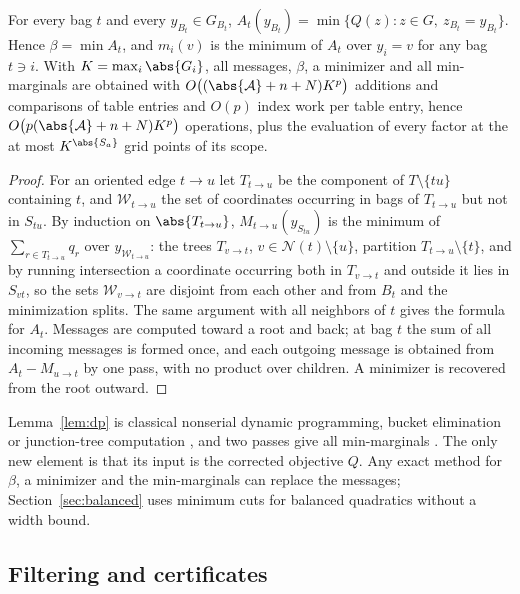 \begin{lemma}\label{lem:dp}
For every bag $t$ and every $y_{B_t}\in G_{B_t}$,
$A_t(y_{B_t})=\min\{Q(z):z\in G,\ z_{B_t}=y_{B_t}\}$. Hence $\beta=\min A_t$, and
$m_i(v)$ is the minimum of $A_t$ over $y_i=v$ for any bag $t\ni i$. With
$K=\max_i\abs{G_i}$, all messages, $\beta$, a minimizer and all min-marginals
are obtained with $O\bigl((\abs{\mathcal A}+n+N)K^p\bigr)$ additions and
comparisons of table entries and $O(p)$ index work per table entry, hence
$O\bigl(p(\abs{\mathcal A}+n+N)K^p\bigr)$ operations, plus the evaluation of
every factor at the at most $K^{\abs{S_a}}$ grid points of its scope.
\end{lemma}

\begin{proof}
For an oriented edge $t\to u$ let $T_{t\to u}$ be the component of
$T\setminus\{tu\}$ containing $t$, and $\mathcal W_{t\to u}$ the set of
coordinates occurring in bags of $T_{t\to u}$ but not in $S_{tu}$. By
induction on $\abs{T_{t\to u}}$, $M_{t\to u}(y_{S_{tu}})$ is the minimum of
$\sum_{r\in T_{t\to u}}q_r$ over $y_{\mathcal W_{t\to u}}$: the trees
$T_{v\to t}$, $v\in\mathcal N(t)\setminus\{u\}$, partition
$T_{t\to u}\setminus\{t\}$, and by running intersection a coordinate occurring
both in $T_{v\to t}$ and outside it lies in $S_{vt}$, so the sets
$\mathcal W_{v\to t}$ are disjoint from each other and from $B_t$ and the
minimization splits. The same argument with all neighbors of $t$ gives the
formula for $A_t$. Messages are computed toward a root and back; at bag $t$
the sum of all incoming messages is formed once, and each outgoing message is
obtained from $A_t-M_{u\to t}$ by one pass, with no product over children. A
minimizer is recovered from the root outward.
\end{proof}

Lemma~\ref{lem:dp} is classical nonserial dynamic programming, bucket
elimination or junction-tree computation \cite{BerteleBrioschi1972,Dechter1999,
LauritzenSpiegelhalter1988}, and two passes give all min-marginals
\cite{WainwrightJaakkolaWillsky2005,KohliTorr2006}. The only new element is
that its input is the corrected objective $Q$. Any exact method for $\beta$, a
minimizer and the min-marginals can replace the messages;
Section~\ref{sec:balanced} uses minimum cuts for balanced quadratics without
a width bound.

\subsection{Filtering and certificates}

